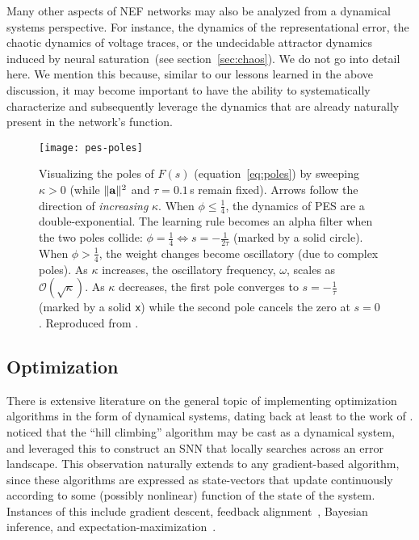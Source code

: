 Many other aspects of NEF networks may also be analyzed from a dynamical systems perspective.
For instance, the dynamics of the representational error, the chaotic dynamics of voltage traces, or the undecidable attractor dynamics induced by neural saturation~(see section~\ref{sec:chaos}).
We do not go into detail here.
We mention this because, similar to our lessons learned in the above discussion, it may become important to have the ability to systematically characterize and subsequently leverage the dynamics that are already naturally present in the network's function.

\begin{figure}
\centering
\texttt{[image: pes-poles]}
\caption{ \label{fig:pes-poles}
  Visualizing the poles of $F(s)$ (equation~\ref{eq:poles}) by sweeping $\kappa > 0$ (while $\| \mathbf{a} \|^2$  and $\tau = 0.1\,$s remain fixed).
  Arrows follow the direction of \emph{increasing} $\kappa$.
  When $\phi \le \frac{1}{4}$, the dynamics of PES are a double-exponential.
  The learning rule becomes an alpha filter when the two poles collide: $\phi = \frac{1}{4} \iff s = -\frac{1}{2\tau}$ (marked by a solid circle).
  When $\phi > \frac{1}{4}$, the weight changes become oscillatory (due to complex poles).
  As $\kappa$ increases, the oscillatory frequency, $\omega$, scales as $\mathcal{O}\left(\sqrt{\kappa}\right)$.
  As $\kappa$ decreases, the first pole converges to $s = -\frac{1}{\tau}$ (marked by a solid \texttt{x}) while the second pole cancels the zero at $s = 0$. %
  Reproduced from \citet[][Figure~4]{voelker2017c}.
}
\end{figure}

\subsection{Optimization}

There is extensive literature on the general topic of implementing optimization algorithms in the form of dynamical systems, dating back at least to the work of \citet{brockett1991dynamical}.
\citet{voelkerimplementing} noticed that the ``hill climbing'' algorithm may be cast as a dynamical system, and leveraged this to construct an SNN that locally searches across an error landscape.
This observation naturally extends to any gradient-based algorithm, since these algorithms are expressed as state-vectors that update continuously according to some (possibly nonlinear) function of the state of the system. 
Instances of this include gradient descent, feedback alignment~\citep{stockel2019align}, Bayesian inference, and expectation-maximization~\citep{sharma2017}.

